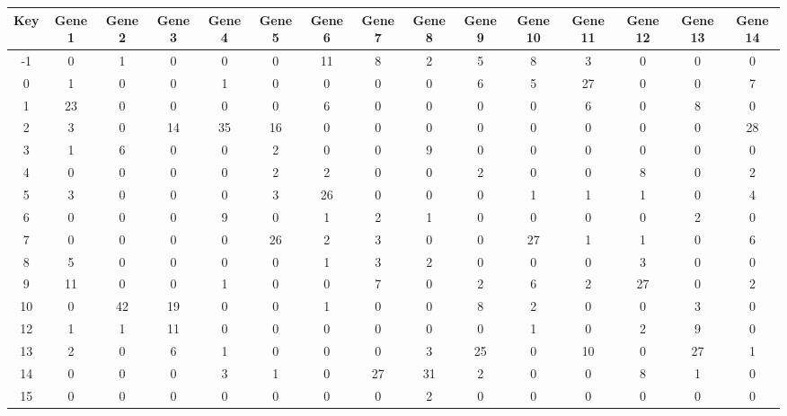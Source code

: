 \begin{tabular}{|c|c|c|c|c|c|c|c|c|c|c|c|c|c|c|}
\hline
Key & Gene 1 & Gene 2 & Gene 3 & Gene 4 & Gene 5 & Gene 6 & Gene 7 & Gene 8 & Gene 9 & Gene 10 & Gene 11 & Gene 12 & Gene 13 & Gene 14 \\
\hline
-1 & 0 & 1 & 0 & 0 & 0 & 11 & 8 & 2 & 5 & 8 & 3 & 0 & 0 & 0 \\
0 & 1 & 0 & 0 & 1 & 0 & 0 & 0 & 0 & 6 & 5 & 27 & 0 & 0 & 7 \\
1 & 23 & 0 & 0 & 0 & 0 & 6 & 0 & 0 & 0 & 0 & 6 & 0 & 8 & 0 \\
2 & 3 & 0 & 14 & 35 & 16 & 0 & 0 & 0 & 0 & 0 & 0 & 0 & 0 & 28 \\
3 & 1 & 6 & 0 & 0 & 2 & 0 & 0 & 9 & 0 & 0 & 0 & 0 & 0 & 0 \\
4 & 0 & 0 & 0 & 0 & 2 & 2 & 0 & 0 & 2 & 0 & 0 & 8 & 0 & 2 \\
5 & 3 & 0 & 0 & 0 & 3 & 26 & 0 & 0 & 0 & 1 & 1 & 1 & 0 & 4 \\
6 & 0 & 0 & 0 & 9 & 0 & 1 & 2 & 1 & 0 & 0 & 0 & 0 & 2 & 0 \\
7 & 0 & 0 & 0 & 0 & 26 & 2 & 3 & 0 & 0 & 27 & 1 & 1 & 0 & 6 \\
8 & 5 & 0 & 0 & 0 & 0 & 1 & 3 & 2 & 0 & 0 & 0 & 3 & 0 & 0 \\
9 & 11 & 0 & 0 & 1 & 0 & 0 & 7 & 0 & 2 & 6 & 2 & 27 & 0 & 2 \\
10 & 0 & 42 & 19 & 0 & 0 & 1 & 0 & 0 & 8 & 2 & 0 & 0 & 3 & 0 \\
12 & 1 & 1 & 11 & 0 & 0 & 0 & 0 & 0 & 0 & 1 & 0 & 2 & 9 & 0 \\
13 & 2 & 0 & 6 & 1 & 0 & 0 & 0 & 3 & 25 & 0 & 10 & 0 & 27 & 1 \\
14 & 0 & 0 & 0 & 3 & 1 & 0 & 27 & 31 & 2 & 0 & 0 & 8 & 1 & 0 \\
15 & 0 & 0 & 0 & 0 & 0 & 0 & 0 & 2 & 0 & 0 & 0 & 0 & 0 & 0 \\
\hline
\end{tabular}